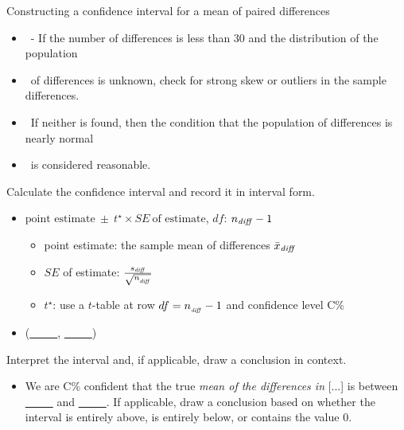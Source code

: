 \begin{onebox}{Constructing a confidence interval for a mean of paired differences}
\begin{itemize}
 \item[] \quad \  - If the number of differences is less than 30 and the distribution of the population 
 \item[] \quad \ of differences is unknown, check for strong skew or outliers in the sample differences.
\item[] \quad \ If neither is found, then the condition that the population of differences is nearly normal 
\item[] \quad \ is considered reasonable.  
\end{itemize}
  Calculate the confidence interval and record it in interval form.
\begin{itemize}
\item[] $\text{point estimate}\ \pm\ t^{\star} \times SE\ \text{of estimate}$, \quad $df$: $n_{\text{\emph{diff}}} - 1$
\begin{itemize}
\item[] point estimate: the sample mean of differences $\bar{x}_{\text{\emph{diff}}}$
\item[] $SE$ of estimate:  $\frac{s_{\text{\emph{diff}}}}{\sqrt{n_{_\text{\emph{diff}}}}}$
\item[] $t^{\star}$: use a $t$-table at row $df = n_{_\text{\emph{diff}}} - 1$ and confidence level C\%
\end{itemize}
\item[] (\underline{\ \ \ \ \ }, \underline{\ \ \ \ \ })
\end{itemize}
 Interpret the interval and, if applicable, draw a conclusion in context.\vspace{-1mm}
\begin{itemize}
\item[] We are C\%  confident that the true \emph{mean of the differences in} [...] is between \underline{\ \ \ \ \ } and  \underline{\ \ \ \ \ }. If applicable, draw a conclusion based on whether the interval is entirely above, is entirely below, or contains the value 0. 
\end{itemize}\end{onebox}



